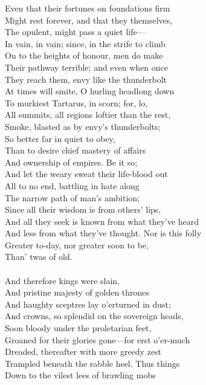 Even that their fortunes on foundations firm\\
Might rest forever, and that they themselves,\\
The opulent, might pass a quiet life—\\
In vain, in vain; since, in the strife to climb\\
On to the heights of honour, men do make\\
Their pathway terrible; and even when once\\
They reach them, envy like the thunderbolt\\
At times will smite, O hurling headlong down\\
To murkiest Tartarus, in scorn; for, lo,\\
All summits, all regions loftier than the rest,\\
Smoke, blasted as by envy's thunderbolts;\\
So better far in quiet to obey,\\
Than to desire chief mastery of affairs\\
And ownership of empires. Be it so;\\
And let the weary sweat their life-blood out\\
All to no end, battling in hate along\\
The narrow path of man's ambition;\\
Since all their wisdom is from others' lips,\\
And all they seek is known from what they've heard\\
And less from what they've thought. Nor is this folly\\
Greater to-day, nor greater soon to be,\\
Than' twas of old.\\
\\
And therefore kings were slain,\\
And pristine majesty of golden thrones\\
And haughty sceptres lay o'erturned in dust;\\
And crowns, so splendid on the sovereign heads,\\
Soon bloody under the proletarian feet,\\
Groaned for their glories gone—for erst o'er-much\\
Dreaded, thereafter with more greedy zest\\
Trampled beneath the rabble heel. Thus things\\
Down to the vilest lees of brawling mobs\\
